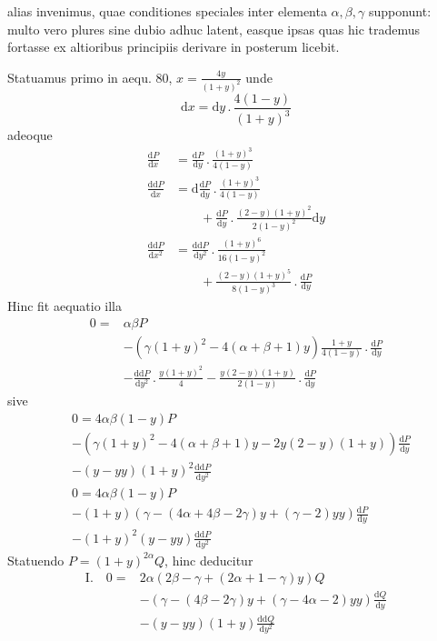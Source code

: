 alias invenimus, quae conditiones speciales inter elementa $\alpha,\beta,\gamma$ supponunt:
multo vero plures sine dubio adhuc latent, easque ipsas quas hic trademus
fortasse ex altioribus principiis derivare in posterum licebit.
\par{}
Statuamus primo in aequ. 80, $x=\frac{4y}{(1+y)^2}$ unde
\[
\mathrm dx=\mathrm dy\mathbin{.}\frac{4(1-y)}{(1+y)^3}
\]
adeoque
\[
\begin{aligned}
\frac{\mathrm dP}{\mathrm dx}&=\frac{\mathrm dP}{\mathrm dy}\mathbin{.}\frac{(1+y)^3}{4(1-y)}\\
\frac{\mathrm{dd}P}{\mathrm dx}&=\mathrm d\frac{\mathrm dP}{\mathrm dy}\mathbin{.}\frac{(1+y)^3}{4(1-y)}\\&\qquad+\frac{\mathrm dP}{\mathrm dy}\mathbin{.}\frac{(2-y)(1+y)^2}{2(1-y)^2}\mathrm dy\\
\frac{\mathrm{dd}P}{\mathrm dx^2}&=\frac{\mathrm{dd}P}{\mathrm dy^2}\mathbin{.}\frac{(1+y)^6}{16(1-y)^2}\\&\qquad+\frac{(2-y)(1+y)^5}{8(1-y)^3}\mathbin{.}\frac{\mathrm dP}{\mathrm dy}
\end{aligned}
\]
Hinc fit aequatio illa
\[
\begin{aligned}
0={}&\alpha\beta P\\
&-(\gamma(1+y)^2-4(\alpha+\beta+1)y)\frac{1+y}{4(1-y)}\mathbin{.}\frac{\mathrm dP}{\mathrm dy}\\
&-\frac{\mathrm{dd}P}{\mathrm dy^2}\mathbin{.}\frac{y(1+y)^2}4
-\frac{y(2-y)(1+y)}{2(1-y)}\mathbin{.}\frac{\mathrm dP}{\mathrm dy}
\end{aligned}
\]
sive
\[
\begin{aligned}
&0=4\alpha\beta(1-y)P\\
&-(\gamma(1+y)^2-4(\alpha+\beta+1)y-2y(2-y)(1+y))\frac{\mathrm dP}{\mathrm dy}\\
&-(y-yy)(1+y)^2\frac{\mathrm{dd}P}{\mathrm dy^2}\\
&0=4\alpha\beta(1-y)P\\
&-(1+y)(\gamma-(4\alpha+4\beta-2\gamma)y+(\gamma-2)yy)\frac{\mathrm dP}{\mathrm dy}\\
&-(1+y)^2(y-yy)\frac{\mathrm{dd}P}{\mathrm dy^2}
\end{aligned}
\]
Statuendo $P=(1+y)^{2\alpha}Q$, hinc deducitur
\[
\begin{aligned}
\mathrm I.\quad 0={}&2\alpha(2\beta-\gamma+(2\alpha+1-\gamma)y)Q\\
&-(\gamma-(4\beta-2\gamma)y+(\gamma-4\alpha-2)yy)\frac{\mathrm dQ}{\mathrm dy}\\
&-(y-yy)(1+y)\frac{\mathrm{dd}Q}{\mathrm dy^2}
\end{aligned}
\]
